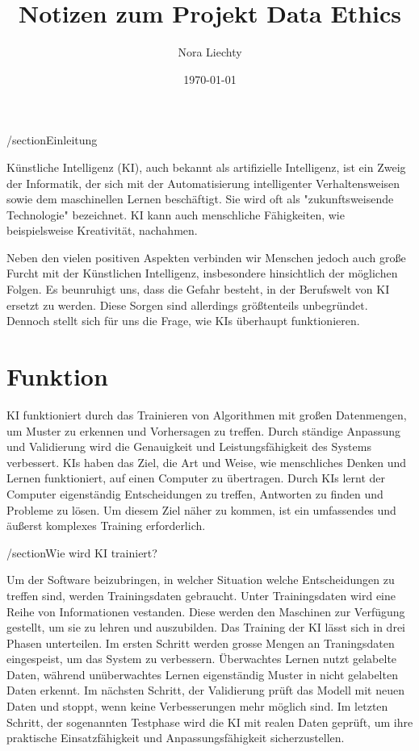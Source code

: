 \documentclass{article}
\title{Notizen zum Projekt Data Ethics}
\author{Nora Liechty}
\date{\today}
\begin{document}
\maketitle


\tableofcontents

/section{Einleitung}

Künstliche Intelligenz (KI), auch bekannt als artifizielle Intelligenz, ist ein Zweig der Informatik, der sich mit der Automatisierung intelligenter Verhaltensweisen sowie dem maschinellen Lernen beschäftigt. Sie wird oft als "zukunftsweisende Technologie" bezeichnet. KI kann auch menschliche Fähigkeiten, wie beispielsweise Kreativität, nachahmen.

Neben den vielen positiven Aspekten verbinden wir Menschen jedoch auch große Furcht mit der Künstlichen Intelligenz, insbesondere hinsichtlich der möglichen Folgen. Es beunruhigt uns, dass die Gefahr besteht, in der Berufswelt von KI ersetzt zu werden. Diese Sorgen sind allerdings größtenteils unbegründet.
Dennoch stellt sich für uns die Frage, wie KIs überhaupt funktionieren. 
 
\section{Funktion}

KI funktioniert durch das Trainieren von Algorithmen mit großen Datenmengen, um Muster zu erkennen und Vorhersagen zu treffen. Durch ständige Anpassung und Validierung wird die Genauigkeit und Leistungsfähigkeit des Systems verbessert. KIs haben das Ziel, die Art und Weise, wie menschliches Denken und Lernen funktioniert, auf einen Computer zu übertragen. Durch KIs lernt der Computer eigenständig Entscheidungen zu treffen, Antworten zu finden und Probleme zu lösen. Um diesem Ziel näher zu kommen, ist ein umfassendes und äußerst komplexes Training erforderlich.

/section{Wie wird KI trainiert?}

Um der Software beizubringen, in welcher Situation welche Entscheidungen zu treffen sind, werden Trainingsdaten gebraucht. Unter Trainingsdaten wird eine Reihe von Informationen vestanden. Diese werden den Maschinen zur Verfügung gestellt, um sie zu lehren und auszubilden. 
Das Training der KI lässt sich in drei Phasen unterteilen. Im ersten Schritt werden grosse Mengen an Traningsdaten eingespeist, um das System zu verbessern. Überwachtes Lernen nutzt gelabelte Daten, während unüberwachtes Lernen eigenständig Muster in nicht gelabelten Daten erkennt.
Im nächsten Schritt, der Validierung prüft das Modell mit neuen Daten und stoppt, wenn keine Verbesserungen mehr möglich sind. Im letzten Schritt, der sogenannten Testphase wird die KI mit realen Daten geprüft, um ihre praktische Einsatzfähigkeit und Anpassungsfähigkeit sicherzustellen.
\end{document}
